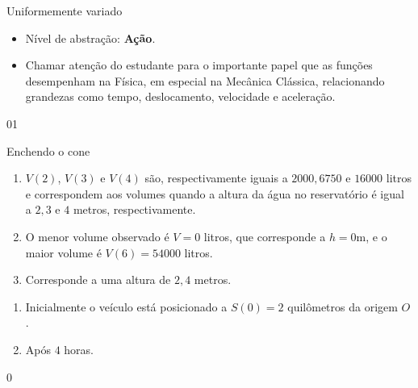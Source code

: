 \begin{sugestions}{Uniformemente variado}
{
\begin{itemize}
\item Nível de abstração: \textbf{Ação}.

\item Chamar atenção do estudante para o importante papel que as funções desempenham na Física, em especial na Mecânica Clássica, relacionando grandezas como tempo, deslocamento, velocidade e aceleração.
\end{itemize}
}{0}{1}
\end{sugestions}
\begin{answer}{Enchendo o cone}
{
\begin{enumerate}

\item $V(2)$, $V(3)$ e $V(4)$ são, respectivamente iguais a $2000, 6750$ e $16000$ litros e correspondem aos volumes quando a altura da água no reservatório é igual a $2,3$ e $4$ metros, respectivamente.

\item O menor volume observado é $V=0$ litros, que corresponde a $h=0$m, e o maior volume é $V(6)=54000$ litros.

\item Corresponde a uma altura de $2,4$ metros.

\end{enumerate}


\begin{enumerate}
\item Inicialmente o veículo está posicionado a $S(0)=2$ quilômetros da origem $O$.

\item Após $4$ horas.

\end{enumerate}
}{0}
\end{answer}



